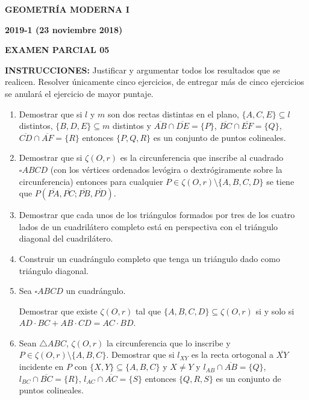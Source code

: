 \documentclass[12pt]{report}
\begin{document}
\begin{center}
\textbf{\LARGE {GEOMETRÍA MODERNA I}}
\end{center}

\begin{center}
\textbf{{\large 2019-1 (23 noviembre 2018)}}
\end{center}

\begin{center}
\textbf{{\large EXAMEN PARCIAL 05}}
\end{center}

\vspace{1cm}

{\bf INSTRUCCIONES:} Justificar y argumentar todos los resultados que se realicen. Resolver únicamente cinco ejercicios, de entregar más de cinco ejercicios se anulará el ejercicio de mayor puntaje.

\vspace{1cm}

\begin{enumerate}

\item Demostrar que si $l$ y $m$ son dos rectas distintas en el plano, $\{A,C,E\}\subseteq l$ distintos, $\{B,D,E\}\subseteq m$ distintos y $\overline{AB}\cap\overline{DE}=\{P\}$, $\overline{BC}\cap\overline{EF}=\{Q\}$, $\overline{CD}\cap\overline{AF}=\{R\}$ entonces $\{P,Q,R\}$ es un conjunto de puntos colineales.

\item Demostrar que si $\zeta(O,r)$ es la circunferencia que inscribe al cuadrado $\square ABCD$ (con los vértices ordenados levógira o dextrógiramente sobre la circunferencia) entonces para cualquier \break  $P\in \zeta(O,r)\setminus \{A,B,C,D\}$ se tiene que $P(\overline{PA},\overline{PC};\overline{PB},\overline{PD})$.

\item Demostrar que cada unos de los triángulos formados por tres de los cuatro lados de un cuadrilátero completo está en perspectiva con el triángulo diagonal del cuadrilátero.

\item Construir un cuadrángulo completo que tenga un triángulo dado como triángulo diagonal.

\item Sea $\square ABCD$ un cuadrángulo.

Demostrar que existe $\zeta(O,r)$ tal que $\{A,B,C,D\}\subseteq \zeta(O,r)$ si y solo si $AD\cdot BC + AB \cdot CD = AC \cdot BD$.

\item Sean $\triangle ABC$, $\zeta(O,r)$ la circunferencia que lo inscribe y $P\in \zeta(O,r)\setminus \{A,B,C\}$. Demostrar que si $l_{XY}$ es la recta ortogonal a $\overline{XY}$ incidente en $P$ con $\{X,Y\} \subseteq \{A,B,C\}$ y $X\neq Y$ y $l_{AB}\cap \overline{AB}=\{Q\}$, $l_{BC}\cap \overline{BC}=\{R\}$, $l_{AC}\cap \overline{AC}=\{S\}$ entonces $\{Q,R,S\}$ es un conjunto de puntos colineales.

\end{enumerate}
\end{document}

